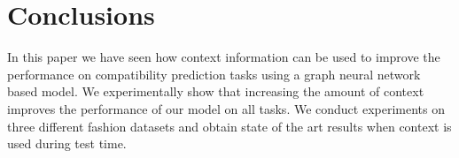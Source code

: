 \documentclass[10pt,twocolumn,letterpaper]{article}
\begin{document}
\section{Conclusions}
In this paper we have seen how context information can be used to improve the performance on compatibility prediction tasks using a graph neural network based model. We experimentally show that increasing the amount of context improves the performance of our model on all tasks. We conduct experiments on three different fashion datasets and obtain state of the art results when context is used during test time. 






{\small


}
\end{document}
